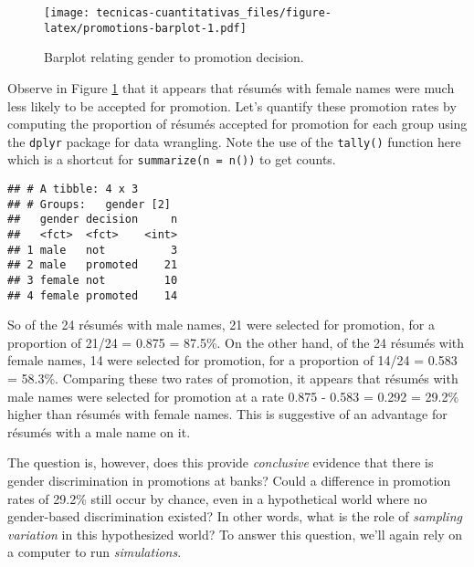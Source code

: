 \documentclass[
]{book}
\newenvironment{Shaded}{\begin{snugshade}}{\end{snugshade}}
\newcommand{\KeywordTok}[1]{\textcolor[rgb]{0.13,0.29,0.53}{\textbf{#1}}}
\newcommand{\NormalTok}[1]{#1}
\newcommand{\OperatorTok}[1]{\textcolor[rgb]{0.81,0.36,0.00}{\textbf{#1}}}
\newcommand{\StringTok}[1]{\textcolor[rgb]{0.31,0.60,0.02}{#1}}
\begin{document}
\begin{figure}
\centering
\texttt{[image: tecnicas-cuantitativas\_files/figure-latex/promotions-barplot-1.pdf]}
\caption{\label{fig:promotions-barplot}Barplot relating gender to promotion decision.}
\end{figure}

Observe in Figure \ref{fig:promotions-barplot} that it appears that résumés with female names were much less likely to be accepted for promotion. Let's quantify these promotion rates by computing the proportion of résumés accepted for promotion for each group using the \texttt{dplyr} package for data wrangling. Note the use of the \texttt{tally()} function here which is a shortcut for \texttt{summarize(n\ =\ n())} to get counts.

\begin{Shaded}
\end{Shaded}

\begin{verbatim}
## # A tibble: 4 x 3
## # Groups:   gender [2]
##   gender decision     n
##   <fct>  <fct>    <int>
## 1 male   not          3
## 2 male   promoted    21
## 3 female not         10
## 4 female promoted    14
\end{verbatim}

So of the 24 résumés with male names, 21 were selected for promotion, for a proportion of 21/24 = 0.875 = 87.5\%. On the other hand, of the 24 résumés with female names, 14 were selected for promotion, for a proportion of 14/24 = 0.583 = 58.3\%. Comparing these two rates of promotion, it appears that résumés with male names were selected for promotion at a rate 0.875 - 0.583 = 0.292 = 29.2\% higher than résumés with female names. This is suggestive of an advantage for résumés with a male name on it.

The question is, however, does this provide \emph{conclusive} evidence that there is gender discrimination in promotions at banks? Could a difference in promotion rates of 29.2\% still occur by chance, even in a hypothetical world where no gender-based discrimination existed? In other words, what is the role of \emph{sampling variation} in this hypothesized world? To answer this question, we'll again rely on a computer to run \emph{simulations}.
\end{document}

